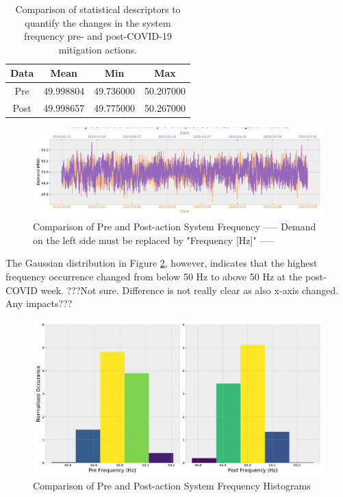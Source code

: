 \documentclass[energies,article,submit,moreauthors,pdftex]{Definitions/mdpi}
\begin{document}
\begin{table}[H]
\caption{Comparison of statistical descriptors to quantify the changes in the system frequency pre- and post-COVID-19 mitigation actions.}\label{table:fre_table}
\centering
\begin{tabular}{cccc}
\toprule
\textbf{Data} & \textbf{Mean}	& \textbf{Min}	& \textbf{Max}\\
\midrule
Pre		& 49.998804			& 49.736000         & 50.207000\\
Post	& 49.998657			& 49.775000         &50.267000\\

\bottomrule
\end{tabular}
\end{table}


\begin{figure}[H]
\centering
\hspace{-25pt}\includegraphics[width=16.5 cm]{Graphics/Freq_pre_post_weekly.pdf}
\caption{Comparison of Pre and Post-action System Frequency  ----- Demand on the left side must be replaced by "Frequency [Hz]" -----} \label{fig:freq_weekly}
\end{figure}  

The Gaussian distribution in Figure \ref{fig:freq_hist}, however, indicates that the highest frequency occurrence changed from below 50 Hz to above 50 Hz at the post-COVID week. ???Not sure. Difference is not really clear as also x-axis changed. Any impacts???

\begin{figure}[H]
\centering

\hspace{-25pt}\includegraphics[width=16.5 cm]{Graphics/Freq_hist_side_by_side.pdf}
\caption{Comparison of Pre and Post-action System Frequency Histograms} \label{fig:freq_hist}
\end{figure}  
\end{document}
